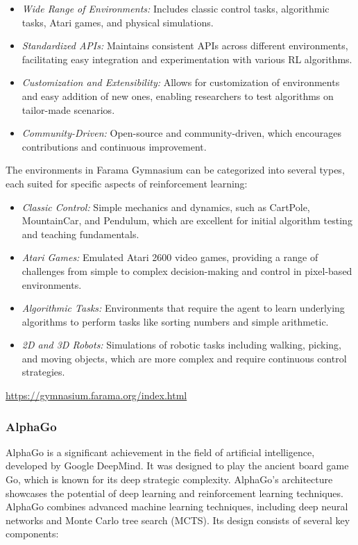 \begin{itemize}
\item \emph{Wide Range of Environments:} Includes classic control tasks, algorithmic tasks, Atari games, and physical simulations.
\item \emph{Standardized APIs:} Maintains consistent APIs across different environments, facilitating easy integration and experimentation with various RL algorithms.
\item \emph{Customization and Extensibility:} Allows for customization of environments and easy addition of new ones, enabling researchers to test algorithms on tailor-made scenarios.
\item \emph{Community-Driven:} Open-source and community-driven, which encourages contributions and continuous improvement.
\end{itemize}

The environments in Farama Gymnasium can be categorized into several types, each suited for specific aspects of reinforcement learning:

\begin{itemize}
\item \emph{Classic Control:} Simple mechanics and dynamics, such as CartPole, MountainCar, and Pendulum, which are excellent for initial algorithm testing and teaching fundamentals.
\item \emph{Atari Games:} Emulated Atari 2600 video games, providing a range of challenges from simple to complex decision-making and control in pixel-based environments.
\item \emph{Algorithmic Tasks:} Environments that require the agent to learn underlying algorithms to perform tasks like sorting numbers and simple arithmetic.
\item \emph{2D and 3D Robots:} Simulations of robotic tasks including walking, picking, and moving objects, which are more complex and require continuous control strategies.
\end{itemize}

\begin{tcolorbox}[colback=code]
\small
\url{https://gymnasium.farama.org/index.html}
\normalsize
\end{tcolorbox}

\subsubsection*{AlphaGo}

AlphaGo is a significant achievement in the field of artificial intelligence, developed by Google DeepMind. It was designed to play the ancient board game Go, which is known for its deep strategic complexity.  AlphaGo's architecture showcases the potential of deep learning and reinforcement learning techniques. AlphaGo combines advanced machine learning techniques, including deep neural networks and Monte Carlo tree search (MCTS). Its design consists of several key components:

